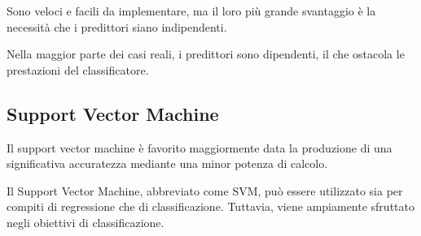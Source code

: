 Sono veloci e facili da implementare, ma il loro più grande svantaggio è la necessità che i predittori siano indipendenti. 

Nella maggior parte dei casi reali, i predittori sono dipendenti, il che ostacola le prestazioni del classificatore.


\subsection{Support Vector Machine}
Il support vector machine è favorito maggiormente data la produzione di una significativa accuratezza mediante una minor potenza di calcolo. 

Il Support Vector Machine, abbreviato come SVM, può essere utilizzato sia per compiti di regressione che di classificazione. Tuttavia, viene ampiamente sfruttato negli obiettivi di classificazione.
